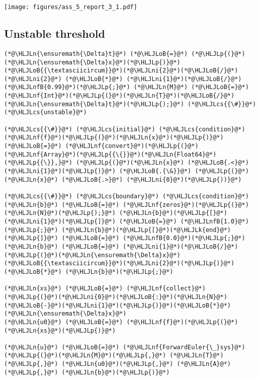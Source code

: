 \documentclass[12pt,a4paper]{article}
\newcommand{\HLJLk}[1]{\textcolor[RGB]{148,91,176}{\textbf{#1}}}
\newcommand{\HLJLn}[1]{#1}
\newcommand{\HLJLnf}[1]{\textcolor[RGB]{66,102,213}{#1}}
\newcommand{\HLJLnfB}[1]{\textcolor[RGB]{59,151,46}{#1}}
\newcommand{\HLJLni}[1]{\textcolor[RGB]{59,151,46}{#1}}
\newcommand{\HLJLoB}[1]{\textcolor[RGB]{102,102,102}{\textbf{#1}}}
\newcommand{\HLJLp}[1]{#1}
\newcommand{\HLJLcs}[1]{\textcolor[RGB]{153,153,119}{\textit{#1}}}
\begin{document}
\texttt{[image: figures/ass\_5\_report\_3\_1.pdf]}

\subsection{Unstable threshold}

\begin{lstlisting}
(*@\HLJLn{\ensuremath{\Delta}t}@*) (*@\HLJLoB{=}@*) (*@\HLJLp{(}@*)(*@\HLJLn{\ensuremath{\Delta}x}@*)(*@\HLJLp{)}@*)(*@\HLJLoB{{\textasciicircum}}@*)(*@\HLJLni{2}@*)(*@\HLJLoB{/}@*)(*@\HLJLni{2}@*) (*@\HLJLoB{*}@*) (*@\HLJLni{1}@*)(*@\HLJLoB{/}@*)(*@\HLJLnfB{0.99}@*)(*@\HLJLp{;}@*) (*@\HLJLn{M}@*) (*@\HLJLoB{=}@*) (*@\HLJLnf{Int}@*)(*@\HLJLp{(}@*)(*@\HLJLn{T}@*)(*@\HLJLoB{/}@*)(*@\HLJLn{\ensuremath{\Delta}t}@*)(*@\HLJLp{);}@*) (*@\HLJLcs{{\#}}@*) (*@\HLJLcs{unstable}@*)

(*@\HLJLcs{{\#}}@*) (*@\HLJLcs{initial}@*) (*@\HLJLcs{condition}@*)
(*@\HLJLnf{f}@*)(*@\HLJLp{(}@*)(*@\HLJLn{x}@*)(*@\HLJLp{)}@*) (*@\HLJLoB{=}@*) (*@\HLJLnf{convert}@*)(*@\HLJLp{(}@*)(*@\HLJLnf{Array}@*)(*@\HLJLp{{\{}}@*)(*@\HLJLn{Float64}@*)(*@\HLJLp{{\}},}@*) (*@\HLJLp{(}@*)(*@\HLJLn{x}@*) (*@\HLJLoB{.<}@*) (*@\HLJLni{1}@*)(*@\HLJLp{)}@*) (*@\HLJLoB{.{\&}}@*) (*@\HLJLp{(}@*)(*@\HLJLn{x}@*) (*@\HLJLoB{.>}@*) (*@\HLJLni{0}@*)(*@\HLJLp{))}@*)

(*@\HLJLcs{{\#}}@*) (*@\HLJLcs{boundary}@*) (*@\HLJLcs{condition}@*)
(*@\HLJLn{b}@*) (*@\HLJLoB{=}@*) (*@\HLJLnf{zeros}@*)(*@\HLJLp{(}@*)(*@\HLJLn{N}@*)(*@\HLJLp{);}@*) (*@\HLJLn{b}@*)(*@\HLJLp{[}@*)(*@\HLJLni{1}@*)(*@\HLJLp{]}@*) (*@\HLJLoB{=}@*) (*@\HLJLnfB{1.0}@*)(*@\HLJLp{;}@*) (*@\HLJLn{b}@*)(*@\HLJLp{[}@*)(*@\HLJLk{end}@*)(*@\HLJLp{]}@*) (*@\HLJLoB{=}@*) (*@\HLJLnfB{0.0}@*)(*@\HLJLp{;}@*) (*@\HLJLn{b}@*) (*@\HLJLoB{=}@*) (*@\HLJLni{1}@*)(*@\HLJLoB{/}@*)(*@\HLJLp{(}@*)(*@\HLJLn{\ensuremath{\Delta}x}@*)(*@\HLJLoB{{\textasciicircum}}@*)(*@\HLJLni{2}@*)(*@\HLJLp{)}@*) (*@\HLJLoB{*}@*) (*@\HLJLn{b}@*)(*@\HLJLp{;}@*)

(*@\HLJLn{xs}@*) (*@\HLJLoB{=}@*) (*@\HLJLnf{collect}@*)(*@\HLJLp{(}@*)(*@\HLJLni{0}@*)(*@\HLJLoB{:}@*)(*@\HLJLn{N}@*)(*@\HLJLoB{-}@*)(*@\HLJLni{1}@*)(*@\HLJLp{)}@*)(*@\HLJLoB{*}@*)(*@\HLJLn{\ensuremath{\Delta}x}@*)
(*@\HLJLn{u0}@*) (*@\HLJLoB{=}@*) (*@\HLJLnf{f}@*)(*@\HLJLp{(}@*)(*@\HLJLn{xs}@*)(*@\HLJLp{)}@*)

(*@\HLJLn{u}@*) (*@\HLJLoB{=}@*) (*@\HLJLnf{ForwardEuler{\_}sys}@*)(*@\HLJLp{(}@*)(*@\HLJLn{M}@*)(*@\HLJLp{,}@*) (*@\HLJLn{T}@*)(*@\HLJLp{,}@*) (*@\HLJLn{u0}@*)(*@\HLJLp{,}@*) (*@\HLJLn{A}@*)(*@\HLJLp{,}@*) (*@\HLJLn{b}@*)(*@\HLJLp{)}@*)


\end{lstlisting}
\end{document}
